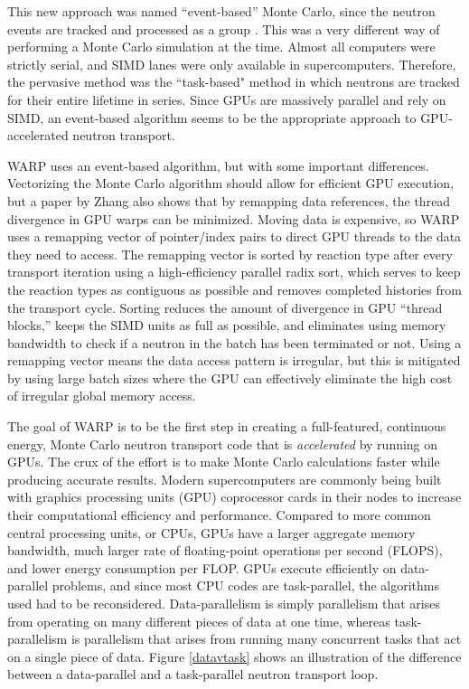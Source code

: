 \documentclass[preprint,12pt]{elsarticle}
\begin{document}
This new approach was named ``event-based'' Monte Carlo, since the neutron events are tracked and processed as a group \cite{vector}.  This was a very different way of performing a Monte Carlo simulation at the time.  Almost all computers were strictly serial, and SIMD lanes were only available in supercomputers.  Therefore, the pervasive method was the ``task-based" method in which neutrons are tracked for their entire lifetime in series.  Since GPUs are massively parallel and rely on SIMD, an event-based algorithm seems to be the appropriate approach to GPU-accelerated neutron transport.  

WARP uses an event-based algorithm, but with some important differences.  Vectorizing the Monte Carlo algorithm should allow for efficient GPU execution, but a paper by Zhang \cite{on_the_fly_remapping} also shows that by remapping data references, the thread divergence in GPU warps can be minimized.  Moving data is expensive, so WARP uses a remapping vector of pointer/index pairs to direct GPU threads to the data they need to access.  The remapping vector is sorted  by reaction type after every transport iteration using a high-efficiency parallel radix sort, which serves to keep the reaction types as contiguous as possible and removes completed histories from the transport cycle.  Sorting reduces the amount of divergence in GPU ``thread blocks,'' keeps the SIMD units as full as possible, and eliminates using memory bandwidth to check if a neutron in the batch has been terminated or not.  Using a remapping vector means the data access pattern is irregular, but this is mitigated by using large batch sizes where the GPU can effectively eliminate the high cost of irregular global memory access.

The goal of WARP is to be the first step in creating a full-featured, continuous energy, Monte Carlo neutron transport code that is \emph{accelerated} by running on GPUs.  The crux of the effort is to make Monte Carlo calculations faster while producing accurate results.  Modern supercomputers are commonly being built with graphics processing units (GPU) coprocessor cards in their nodes to increase their computational efficiency and performance.  Compared to more common central processing units, or CPUs, GPUs have a larger aggregate memory bandwidth, much larger rate of floating-point operations per second (FLOPS), and lower energy consumption per FLOP.  GPUs execute efficiently on data-parallel problems, and since most CPU codes are task-parallel, the algorithms used had to be reconsidered.  Data-parallelism is simply parallelism that arises from operating on many different pieces of data at one time, whereas task-parallelism is parallelism that arises from running many concurrent tasks that act on a single piece of data.   Figure \ref{datavtask} shows an illustration of the difference between a data-parallel and a task-parallel neutron transport loop.
\end{document}
